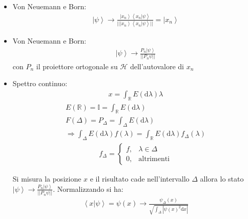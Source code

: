 \begin{itemize}
\item Von Neuemann e Born:
\begin{equation}\begin{split}
\left |\psi  \right\rangle \rightarrow \frac{\left |x_n \right\rangle\left\langle x_n|\psi  \right\rangle}{||\left |x_n \right\rangle\left\langle x_n|\psi  \right\rangle||}=\left |x_n \right\rangle
\end{split}\end{equation}
\item Von Neuemann e Born:
\begin{equation}\begin{split}
\left |\psi  \right\rangle \rightarrow \frac{P_n\left |\psi  \right\rangle}{||P_n\psi ||}
\end{split}\end{equation}
con $P_n$ il proiettore ortogonale su $\mathcal{H}$ dell'autovalore di $x_n$
\item Spettro continuo:
\begin{equation}\begin{split}
x=\int_{\mathbb{R} }{E\left(\textrm{d}\lambda\right)\lambda}
\end{split}\end{equation}
\begin{equation}\begin{split}
E\left(\mathbb{R} \right)=\mathbb{I}=\int_{\mathbb{R} }{E\left(\textrm{d}\lambda\right)} \\
F\left(\Delta\right)=P_{\Delta}=\int_{\Delta}{E\left(\textrm{d}\lambda\right)} \\
\Longrightarrow \int_{\Delta}{E\left(\textrm{d}\lambda\right)f\left(\lambda\right)}=\int_{\mathbb{R} }{E\left(\textrm{d}\lambda\right)f_\Delta\left(\lambda\right)}
\end{split}\end{equation}
\begin{equation}\begin{split}f_\Delta=
\begin{cases}
f, & \lambda\in\Delta \\
0, & \textrm{altrimenti}
\end{cases}
\end{split}\end{equation}

Si misura la posizione $x$ e il risultato cade nell'intervallo $\Delta$ allora lo stato $\left |\psi  \right\rangle \rightarrow \frac{P_n\left |\psi  \right\rangle}{||P_n\psi ||}$. Normalizzando si ha:
\begin{equation}\begin{split}
\left\langle x|\psi  \right\rangle=\psi \left(x\right) \rightarrow \frac{\psi _\Delta\left(x\right)}{\sqrt{\int_{\Delta}{|\psi \left(x\right)^2\textrm{d}x|}}}
\end{split}\end{equation}
\end{itemize}

